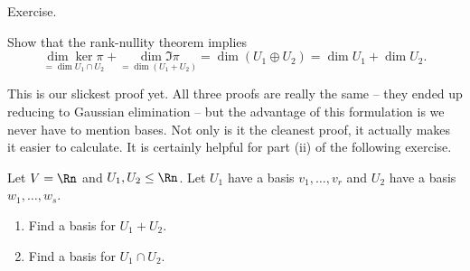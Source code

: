 \begin{proof*}
	Exercise. %
\end{proof*}

\begin{corollary}
	Show that the rank-nullity theorem implies %
	\begin{equation*}
		\underset{=\dim U_1\cap U_2}{\dim\ker\pi} + \underset{=\dim(U_1+U_2)}{\dim\Im\pi} = \dim(U_1\oplus U_2) = \dim U_1+\dim U_2. %
	\end{equation*}
\end{corollary}

\vspace{-6pt}
This is our slickest proof yet. All three proofs are really the same -- they ended up reducing to Gaussian elimination -- but the advantage of this formulation is we never have to mention bases. Not only is it the cleanest proof, it actually makes it easier to calculate. It is certainly helpful for part (ii) of the following exercise.

\begin{exercise}
	Let $V=\Rn$ and $U_1,U_2\leq \Rn$. Let $U_1$ have a basis $v_1,\ldots,v_r$ and $U_2$ have a basis $w_1,\ldots,w_s$. %
	\begin{enumerate}
		\shortskip
		\item Find a basis for $U_1+U_2$.
		\item Find a basis for $U_1\cap U_2$.
	\end{enumerate}
\end{exercise}

